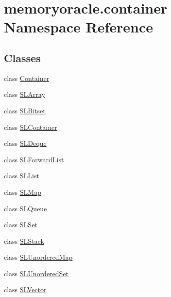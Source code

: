 \hypertarget{namespacememoryoracle_1_1container}{}\section{memoryoracle.\+container Namespace Reference}
\label{namespacememoryoracle_1_1container}
\subsection*{Classes}
\begin{DoxyCompactItemize}
\item 
class \hyperlink{classmemoryoracle_1_1container_1_1Container}{Container}
\item 
class \hyperlink{classmemoryoracle_1_1container_1_1SLArray}{S\+L\+Array}
\item 
class \hyperlink{classmemoryoracle_1_1container_1_1SLBitset}{S\+L\+Bitset}
\item 
class \hyperlink{classmemoryoracle_1_1container_1_1SLContainer}{S\+L\+Container}
\item 
class \hyperlink{classmemoryoracle_1_1container_1_1SLDeque}{S\+L\+Deque}
\item 
class \hyperlink{classmemoryoracle_1_1container_1_1SLForwardList}{S\+L\+Forward\+List}
\item 
class \hyperlink{classmemoryoracle_1_1container_1_1SLList}{S\+L\+List}
\item 
class \hyperlink{classmemoryoracle_1_1container_1_1SLMap}{S\+L\+Map}
\item 
class \hyperlink{classmemoryoracle_1_1container_1_1SLQueue}{S\+L\+Queue}
\item 
class \hyperlink{classmemoryoracle_1_1container_1_1SLSet}{S\+L\+Set}
\item 
class \hyperlink{classmemoryoracle_1_1container_1_1SLStack}{S\+L\+Stack}
\item 
class \hyperlink{classmemoryoracle_1_1container_1_1SLUnorderedMap}{S\+L\+Unordered\+Map}
\item 
class \hyperlink{classmemoryoracle_1_1container_1_1SLUnorderedSet}{S\+L\+Unordered\+Set}
\item 
class \hyperlink{classmemoryoracle_1_1container_1_1SLVector}{S\+L\+Vector}
\end{DoxyCompactItemize}
